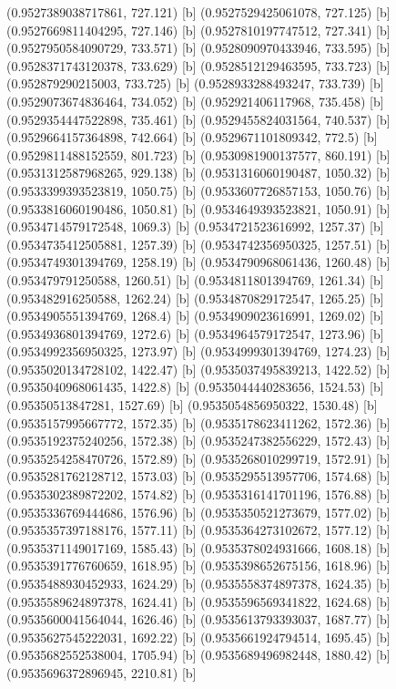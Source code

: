 {{{(0.9527389038717861, 727.121) [b] 
(0.9527529425061078, 727.125) [b] 
(0.9527669811404295, 727.146) [b] 
(0.9527810197747512, 727.341) [b] 
(0.9527950584090729, 733.571) [b] 
(0.9528090970433946, 733.595) [b] 
(0.9528371743120378, 733.629) [b] 
(0.9528512129463595, 733.723) [b] 
(0.952879290215003, 733.725) [b] 
(0.9528933288493247, 733.739) [b] 
(0.9529073674836464, 734.052) [b] 
(0.952921406117968, 735.458) [b] 
(0.9529354447522898, 735.461) [b] 
(0.9529455824031564, 740.537) [b] 
(0.9529664157364898, 742.664) [b] 
(0.9529671101809342, 772.5) [b] 
(0.9529811488152559, 801.723) [b] 
(0.9530981900137577, 860.191) [b] 
(0.9531312587968265, 929.138) [b] 
(0.9531316060190487, 1050.32) [b] 
(0.9533399393523819, 1050.75) [b] 
(0.9533607726857153, 1050.76) [b] 
(0.9533816060190486, 1050.81) [b] 
(0.9534649393523821, 1050.91) [b] 
(0.9534714579172548, 1069.3) [b] 
(0.9534721523616992, 1257.37) [b] 
(0.9534735412505881, 1257.39) [b] 
(0.9534742356950325, 1257.51) [b] 
(0.9534749301394769, 1258.19) [b] 
(0.9534790968061436, 1260.48) [b] 
(0.953479791250588, 1260.51) [b] 
(0.9534811801394769, 1261.34) [b] 
(0.953482916250588, 1262.24) [b] 
(0.9534870829172547, 1265.25) [b] 
(0.9534905551394769, 1268.4) [b] 
(0.9534909023616991, 1269.02) [b] 
(0.9534936801394769, 1272.6) [b] 
(0.9534964579172547, 1273.96) [b] 
(0.9534992356950325, 1273.97) [b] 
(0.9534999301394769, 1274.23) [b] 
(0.9535020134728102, 1422.47) [b] 
(0.9535037495839213, 1422.52) [b] 
(0.9535040968061435, 1422.8) [b] 
(0.9535044440283656, 1524.53) [b] 
(0.95350513847281, 1527.69) [b] 
(0.9535054856950322, 1530.48) [b] 
(0.9535157995667772, 1572.35) [b] 
(0.9535178623411262, 1572.36) [b] 
(0.9535192375240256, 1572.38) [b] 
(0.9535247382556229, 1572.43) [b] 
(0.9535254258470726, 1572.89) [b] 
(0.9535268010299719, 1572.91) [b] 
(0.9535281762128712, 1573.03) [b] 
(0.9535295513957706, 1574.68) [b] 
(0.9535302389872202, 1574.82) [b] 
(0.9535316141701196, 1576.88) [b] 
(0.9535336769444686, 1576.96) [b] 
(0.9535350521273679, 1577.02) [b] 
(0.9535357397188176, 1577.11) [b] 
(0.9535364273102672, 1577.12) [b] 
(0.9535371149017169, 1585.43) [b] 
(0.9535378024931666, 1608.18) [b] 
(0.9535391776760659, 1618.95) [b] 
(0.9535398652675156, 1618.96) [b] 
(0.9535488930452933, 1624.29) [b] 
(0.9535558374897378, 1624.35) [b] 
(0.9535589624897378, 1624.41) [b] 
(0.9535596569341822, 1624.68) [b] 
(0.9535600041564044, 1626.46) [b] 
(0.9535613793393037, 1687.77) [b] 
(0.9535627545222031, 1692.22) [b] 
(0.9535661924794514, 1695.45) [b] 
(0.9535682552538004, 1705.94) [b] 
(0.9535689496982448, 1880.42) [b] 
(0.9535696372896945, 2210.81) [b] 
}}}
